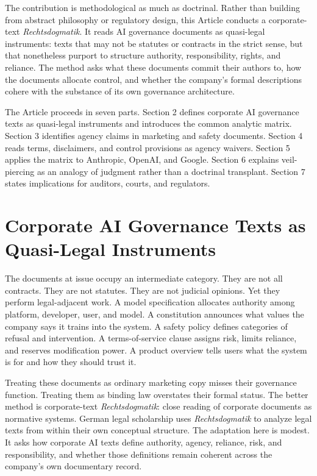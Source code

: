 \documentclass[11pt,a4paper]{article}
\begin{document}
The contribution is methodological as much as doctrinal. Rather than building from abstract philosophy or regulatory design, this Article conducts a corporate-text \emph{Rechtsdogmatik}. It reads AI governance documents as quasi-legal instruments: texts that may not be statutes or contracts in the strict sense, but that nonetheless purport to structure authority, responsibility, rights, and reliance. The method asks what these documents commit their authors to, how the documents allocate control, and whether the company's formal descriptions cohere with the substance of its own governance architecture.

The Article proceeds in seven parts. Section 2 defines corporate AI governance texts as quasi-legal instruments and introduces the common analytic matrix. Section 3 identifies agency claims in marketing and safety documents. Section 4 reads terms, disclaimers, and control provisions as agency waivers. Section 5 applies the matrix to Anthropic, OpenAI, and Google. Section 6 explains veil-piercing as an analogy of judgment rather than a doctrinal transplant. Section 7 states implications for auditors, courts, and regulators.

\section{Corporate AI Governance Texts as Quasi-Legal Instruments}

The documents at issue occupy an intermediate category. They are not all contracts. They are not statutes. They are not judicial opinions. Yet they perform legal-adjacent work. A model specification allocates authority among platform, developer, user, and model. A constitution announces what values the company says it trains into the system. A safety policy defines categories of refusal and intervention. A terms-of-service clause assigns risk, limits reliance, and reserves modification power. A product overview tells users what the system is for and how they should trust it.

Treating these documents as ordinary marketing copy misses their governance function. Treating them as binding law overstates their formal status. The better method is corporate-text \emph{Rechtsdogmatik}: close reading of corporate documents as normative systems. German legal scholarship uses \emph{Rechtsdogmatik} to analyze legal texts from within their own conceptual structure. The adaptation here is modest. It asks how corporate AI texts define authority, agency, reliance, risk, and responsibility, and whether those definitions remain coherent across the company's own documentary record.
\end{document}
